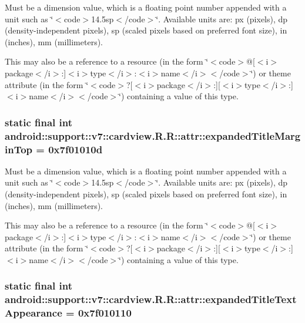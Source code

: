 Must be a dimension value, which is a floating point number appended with a unit such as \char`\"{}$<$code$>$14.5sp$<$/code$>$\char`\"{}. Available units are: px (pixels), dp (density-independent pixels), sp (scaled pixels based on preferred font size), in (inches), mm (millimeters). 

This may also be a reference to a resource (in the form \char`\"{}$<$code$>$@\mbox{[}$<$i$>$package$<$/i$>$:\mbox{]}$<$i$>$type$<$/i$>$:$<$i$>$name$<$/i$>$$<$/code$>$\char`\"{}) or theme attribute (in the form \char`\"{}$<$code$>$?\mbox{[}$<$i$>$package$<$/i$>$:\mbox{]}\mbox{[}$<$i$>$type$<$/i$>$:\mbox{]}$<$i$>$name$<$/i$>$$<$/code$>$\char`\"{}) containing a value of this type. \hypertarget{classandroid_1_1support_1_1v7_1_1cardview_1_1_r_1_1attr_4b1afa4e3f8ea65f0b42198fc5655921}{
\subsubsection[{expandedTitleMarginTop}]{\setlength{\rightskip}{0pt plus 5cm}static final int android::support::v7::cardview.R.R::attr::expandedTitleMarginTop = 0x7f01010d}}
\label{classandroid_1_1support_1_1v7_1_1cardview_1_1_r_1_1attr_4b1afa4e3f8ea65f0b42198fc5655921}


Must be a dimension value, which is a floating point number appended with a unit such as \char`\"{}$<$code$>$14.5sp$<$/code$>$\char`\"{}. Available units are: px (pixels), dp (density-independent pixels), sp (scaled pixels based on preferred font size), in (inches), mm (millimeters). 

This may also be a reference to a resource (in the form \char`\"{}$<$code$>$@\mbox{[}$<$i$>$package$<$/i$>$:\mbox{]}$<$i$>$type$<$/i$>$:$<$i$>$name$<$/i$>$$<$/code$>$\char`\"{}) or theme attribute (in the form \char`\"{}$<$code$>$?\mbox{[}$<$i$>$package$<$/i$>$:\mbox{]}\mbox{[}$<$i$>$type$<$/i$>$:\mbox{]}$<$i$>$name$<$/i$>$$<$/code$>$\char`\"{}) containing a value of this type. \hypertarget{classandroid_1_1support_1_1v7_1_1cardview_1_1_r_1_1attr_b4eb2b2900ce7fd7cfe82d6d2e338ce5}{
\subsubsection[{expandedTitleTextAppearance}]{\setlength{\rightskip}{0pt plus 5cm}static final int android::support::v7::cardview.R.R::attr::expandedTitleTextAppearance = 0x7f010110}}
\label{classandroid_1_1support_1_1v7_1_1cardview_1_1_r_1_1attr_b4eb2b2900ce7fd7cfe82d6d2e338ce5}


